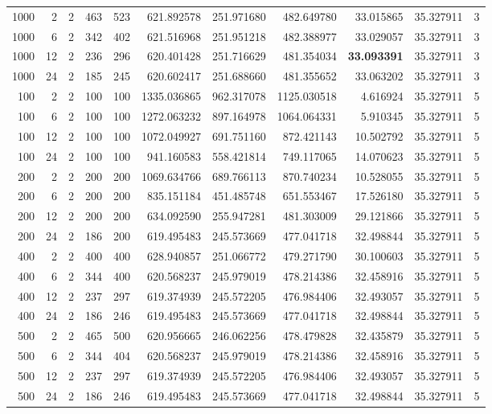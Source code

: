 \begin{table}
\begin{tabular}{rrrrrrrrrrr}
1000 & 2 & 2 & 463 & 523 & 621.892578 & 251.971680 & 482.649780 & 33.015865 & 35.327911 & 3 \\
1000 & 6 & 2 & 342 & 402 & 621.516968 & 251.951218 & 482.388977 & 33.029057 & 35.327911 & 3 \\
1000 & 12 & 2 & 236 & 296 & 620.401428 & 251.716629 & 481.354034 & \textbf{33.093391} & 35.327911 & 3 \\
1000 & 24 & 2 & 185 & 245 & 620.602417 & 251.688660 & 481.355652 & 33.063202 & 35.327911 & 3 \\
100 & 2 & 2 & 100 & 100 & 1335.036865 & 962.317078 & 1125.030518 & 4.616924 & 35.327911 & 5 \\
100 & 6 & 2 & 100 & 100 & 1272.063232 & 897.164978 & 1064.064331 & 5.910345 & 35.327911 & 5 \\
100 & 12 & 2 & 100 & 100 & 1072.049927 & 691.751160 & 872.421143 & 10.502792 & 35.327911 & 5 \\
100 & 24 & 2 & 100 & 100 & 941.160583 & 558.421814 & 749.117065 & 14.070623 & 35.327911 & 5 \\
200 & 2 & 2 & 200 & 200 & 1069.634766 & 689.766113 & 870.740234 & 10.528055 & 35.327911 & 5 \\
200 & 6 & 2 & 200 & 200 & 835.151184 & 451.485748 & 651.553467 & 17.526180 & 35.327911 & 5 \\
200 & 12 & 2 & 200 & 200 & 634.092590 & 255.947281 & 481.303009 & 29.121866 & 35.327911 & 5 \\
200 & 24 & 2 & 186 & 200 & 619.495483 & 245.573669 & 477.041718 & 32.498844 & 35.327911 & 5 \\
400 & 2 & 2 & 400 & 400 & 628.940857 & 251.066772 & 479.271790 & 30.100603 & 35.327911 & 5 \\
400 & 6 & 2 & 344 & 400 & 620.568237 & 245.979019 & 478.214386 & 32.458916 & 35.327911 & 5 \\
400 & 12 & 2 & 237 & 297 & 619.374939 & 245.572205 & 476.984406 & 32.493057 & 35.327911 & 5 \\
400 & 24 & 2 & 186 & 246 & 619.495483 & 245.573669 & 477.041718 & 32.498844 & 35.327911 & 5 \\
500 & 2 & 2 & 465 & 500 & 620.956665 & 246.062256 & 478.479828 & 32.435879 & 35.327911 & 5 \\
500 & 6 & 2 & 344 & 404 & 620.568237 & 245.979019 & 478.214386 & 32.458916 & 35.327911 & 5 \\
500 & 12 & 2 & 237 & 297 & 619.374939 & 245.572205 & 476.984406 & 32.493057 & 35.327911 & 5 \\
500 & 24 & 2 & 186 & 246 & 619.495483 & 245.573669 & 477.041718 & 32.498844 & 35.327911 & 5 \\

\end{tabular}
\end{table}
